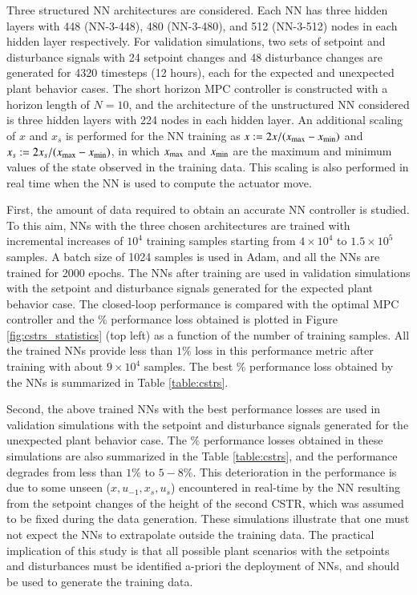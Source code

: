 \documentclass[preprint,5p, twocolumn, authoryear]{elsarticle}
\begin{document}
Three structured NN architectures are considered. Each NN has three hidden
layers with 448 (NN-3-448), 480 (NN-3-480), and 512 (NN-3-512) nodes in each
hidden layer respectively. For validation simulations, two sets of setpoint and
disturbance signals with 24 setpoint changes and 48 disturbance changes are
generated for 4320 timesteps (12 hours), each for the expected and unexpected
plant behavior cases. The short horizon MPC controller is constructed with a
horizon length of $N = 10$, and the architecture of the unstructured NN
considered is three hidden layers with 224 nodes in each hidden layer. An
additional scaling of $x$ and $x_s$ is performed for the NN training as $x :=
2x/(x_{\textnormal{max}} - x_{\textnormal{min}})$ and $x_s :=
2x_s/(x_{\textnormal{max}} - x_{\textnormal{min}})$, in which
$x_{\textnormal{max}}$ and $x_{\textnormal{min}}$ are the maximum and minimum
values of the state observed in the training data. This scaling is also
performed in real time when the NN is used to compute the actuator move.

First, the amount of data required to obtain an accurate NN controller is
studied. To this aim, NNs with the three chosen architectures are trained with
incremental increases of $10^4$ training samples starting from $4 \times 10^4$
to $1.5 \times 10^5$ samples. A batch size of 1024 samples is used in Adam, and
all the NNs are trained for 2000 epochs. The NNs after training are used in
validation simulations with the setpoint and disturbance signals generated for
the expected plant behavior case. The closed-loop performance is compared with
the optimal MPC controller and the $\%$ performance loss obtained is plotted in
Figure \ref{fig:cstrs_statistics} (top left) as a function of the number of
training samples. All the trained NNs provide less than $1 \%$ loss in this
performance metric after training with about $9 \times 10^4$ samples. The best
$\%$ performance loss obtained by the NNs is summarized in Table
\ref{table:cstrs}. 

Second, the above trained NNs with the best performance losses are used in
validation simulations with the setpoint and disturbance signals generated for
the unexpected plant behavior case. The $\%$ performance losses obtained in
these simulations are also summarized in the Table \ref{table:cstrs}, and the
performance degrades from less than $1\%$ to $5-8\%$. This deterioration in the
performance is due to some unseen ($x, u_{-1}, x_s, u_s$) encountered in
real-time by the NN resulting from the setpoint changes of the height of the
second CSTR, which was assumed to be fixed during the data generation. These
simulations illustrate that one must not expect the NNs to extrapolate outside
the training data. The practical implication of this study is that all possible
plant scenarios with the setpoints and disturbances must be identified a-priori
the deployment of NNs, and should be used to generate the training data.
\end{document}
